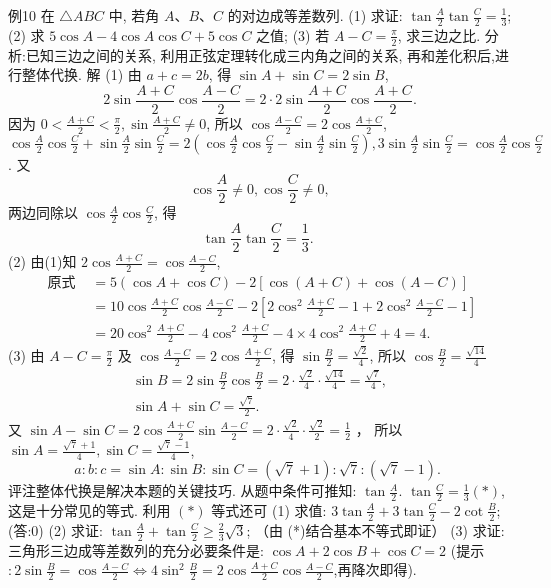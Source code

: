 例10 在 $\triangle A B C$ 中, 若角 $A 、 B 、 C$ 的对边成等差数列.
(1) 求证: $\tan \frac{A}{2} \tan \frac{C}{2}=\frac{1}{3}$;
(2) 求 $5 \cos A-4 \cos A \cos C+5 \cos C$ 之值;
(3) 若 $A-C=\frac{\pi}{2}$, 求三边之比.
分析:已知三边之间的关系, 利用正弦定理转化成三内角之间的关系, 再和差化积后,进行整体代换.
解 (1) 由 $a+c=2 b$, 得 $\sin A+\sin C=2 \sin B$,
$$
2 \sin \frac{A+C}{2} \cos \frac{A-C}{2}=2 \cdot 2 \sin \frac{A+C}{2} \cos \frac{A+C}{2} .
$$
因为 $0<\frac{A+C}{2}<\frac{\pi}{2}, \sin \frac{A+C}{2} \neq 0$, 所以 $\cos \frac{A-C}{2}=2 \cos \frac{A+C}{2}$, $\cos \frac{A}{2} \cos \frac{C}{2}+\sin \frac{A}{2} \sin \frac{C}{2}=2\left(\cos \frac{A}{2} \cos \frac{C}{2}-\sin \frac{A}{2} \sin \frac{C}{2}\right), 3 \sin \frac{A}{2} \sin \frac{C}{2}= \cos \frac{A}{2} \cos \frac{C}{2}$.
又
$$
\cos \frac{A}{2} \neq 0, \cos \frac{C}{2} \neq 0,
$$
两边同除以 $\cos \frac{A}{2} \cos \frac{C}{2}$, 得
$$
\tan \frac{A}{2} \tan \frac{C}{2}=\frac{1}{3} \text {. }
$$
(2) 由(1)知 $2 \cos \frac{A+C}{2}=\cos \frac{A-C}{2}$,
$$
\begin{aligned}
\text { 原式 } & =5(\cos A+\cos C)-2[\cos (A+C)+\cos (A-C)] \\
& =10 \cos \frac{A+C}{2} \cos \frac{A-C}{2}-2\left[2 \cos ^2 \frac{A+C}{2}-1+2 \cos ^2 \frac{A-C}{2}-1\right] \\
& =20 \cos ^2 \frac{A+C}{2}-4 \cos ^2 \frac{A+C}{2}-4 \times 4 \cos ^2 \frac{A+C}{2}+4=4 .
\end{aligned}
$$
(3) 由 $A-C=\frac{\pi}{2}$ 及 $\cos \frac{A-C}{2}=2 \cos \frac{A+C}{2}$, 得 $\sin \frac{B}{2}=\frac{\sqrt{2}}{4}$, 所以 $\cos \frac{B}{2}=\frac{\sqrt{14}}{4}$
$$
\begin{gathered}
\sin B=2 \sin \frac{B}{2} \cos \frac{B}{2}=2 \cdot \frac{\sqrt{2}}{4} \cdot \frac{\sqrt{14}}{4}=\frac{\sqrt{7}}{4}, \\
\sin A+\sin C=\frac{\sqrt{7}}{2} .
\end{gathered}
$$
又 $\sin A-\sin C=2 \cos \frac{A+C}{2} \sin \frac{A-C}{2}=2 \cdot \frac{\sqrt{2}}{4} \cdot \frac{\sqrt{2}}{2}=\frac{1}{2}$ ，
所以 $\sin A=\frac{\sqrt{7}+1}{4}, \sin C=\frac{\sqrt{7}-1}{4}$,
$$
a: b: c=\sin A: \sin B: \sin C=(\sqrt{7}+1): \sqrt{7}:(\sqrt{7}-1) \text {. }
$$
评注整体代换是解决本题的关键技巧.
从题中条件可推知: $\tan \frac{A}{2}$. $\tan \frac{C}{2}=\frac{1}{3}(*)$, 这是十分常见的等式.
利用 $(*)$ 等式还可
(1) 求值: $3 \tan \frac{A}{2}+3 \tan \frac{C}{2}-2 \cot \frac{B}{2}$;
(答:0)
(2) 求证: $\tan \frac{A}{2}+\tan \frac{C}{2} \geqslant \frac{2}{3} \sqrt{3}$;
（由 (*)结合基本不等式即证）
(3) 求证:三角形三边成等差数列的充分必要条件是: $\cos A+2 \cos B+ \cos C=2$ (提示 $: 2 \sin \frac{B}{2}=\cos \frac{A-C}{2} \Leftrightarrow 4 \sin ^2 \frac{B}{2}=2 \cos \frac{A+C}{2} \cos \frac{A-C}{2}$,再降次即得).



